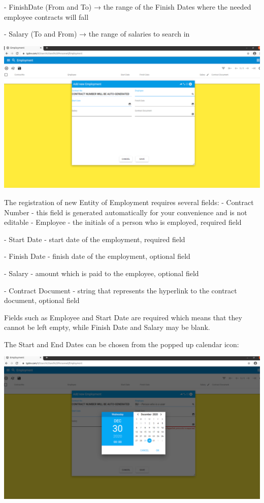 - FinishDate (From and To) → the range of the Finish Dates where the needed employee contracts will fall

- Salary (To and From) → the range of salaries to search in

\includegraphics[width=\textwidth]{sections/01-chapter/images/employment3.png}

The registration of new Entity of Employment requires several fields:
- Contract Number - this field is generated automatically for your convenience and is not editable
- Employee - the initials of a person who is employed, required field

- Start Date - start date of the employment, required field

- Finish Date - finish date of the employment, optional field

- Salary - amount which is paid to the employee, optional field

- Contract Document - string that represents the hyperlink to the contract document, optional field

Fields  such as Employee and Start Date are required which means that they cannot be left empty, while Finish Date and Salary may be blank.

The Start and End Dates can be chosen from the popped up calendar icon:

\includegraphics[width=\textwidth]{sections/01-chapter/images/employmentdates.png}


